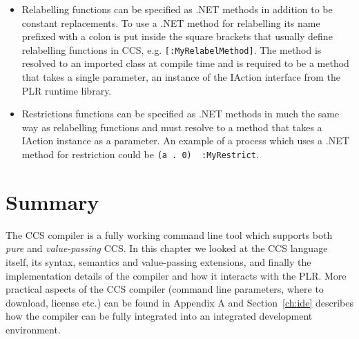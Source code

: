 \begin{itemize}
		\item Relabelling functions can be specified as .NET methods in addition 
		to be constant replacements. To use a .NET method for relabelling its name 
		prefixed with a colon is put inside the square brackets that usually 
		define relabelling functions in CCS, e.g. \texttt{[:MyRelabelMethod]}. The 
		method is resolved to an imported class at compile time and is required to 
		be a method that takes a single parameter, an instance of the 
		\textsf{IAction} interface from the PLR runtime library.
		
		\item Restrictions functions can be specified as .NET methods in much the 
		same way as relabelling functions and must resolve to a method that takes 
		a \textsf{IAction} instance as a parameter. An example of a process which 
		uses a .NET method for restriction could be \texttt{(a . 0) \ :MyRestrict}.

	\end{itemize}
	
\section{Summary}
	
	The CCS compiler is a fully working command line tool which supports both 
	\textit{pure} and \textit{value-passing} CCS. In this chapter we looked at 
	the CCS language itself, its syntax, semantics and value-passing extensions, 
	and finally the implementation details of the compiler and how it interacts 
	with the PLR.	More practical aspects of the CCS compiler (command line 
	parameters, where to download, license etc.) can be found in Appendix A and 
	Section~\ref{ch:ide} describes how the compiler can be fully integrated into 
	an integrated development environment.